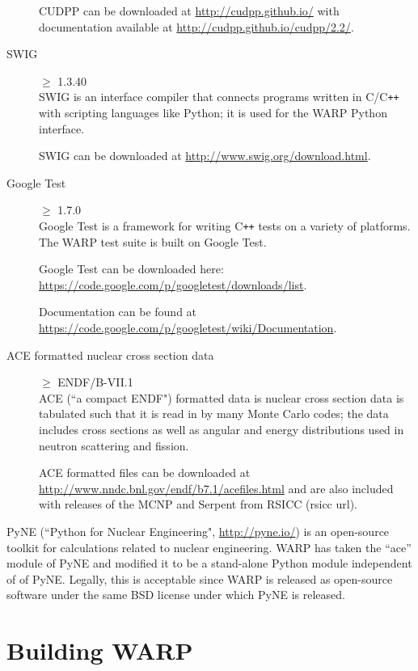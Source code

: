 \documentclass[twoside,a4paper]{refart}
\begin{document}
\begin{description}
CUDPP can be downloaded at \url{http://cudpp.github.io/} with documentation available at 
\url{http://cudpp.github.io/cudpp/2.2/}.

\item[SWIG]$\ge$ 1.3.40 \\
SWIG is an interface compiler that connects programs written in C/C\texttt{++} with scripting languages
like Python; it is used for the WARP Python interface.

SWIG can be downloaded at \url{http://www.swig.org/download.html}.

\item[Google Test]$\ge$ 1.7.0 \\
Google Test is a framework for writing C\texttt{++} tests on a variety of platforms. The WARP test suite
is built on Google Test.

Google Test can be downloaded here: \url{https://code.google.com/p/googletest/downloads/list}.

Documentation can be found at \url{https://code.google.com/p/googletest/wiki/Documentation}.

\item[ACE formatted nuclear cross section data]
$\ge$ ENDF/B-VII.1 \\
ACE (``a compact ENDF") formatted data is nuclear cross section data is tabulated such that it is read in 
by many Monte Carlo codes; the data includes cross sections as well as angular and energy distributions 
used in neutron scattering and fission.

ACE formatted files can be downloaded at \url{http://www.nndc.bnl.gov/endf/b7.1/acefiles.html} and are 
also included with releases of the MCNP and Serpent from RSICC (rsicc url).

\end{description}

PyNE (``Python for Nuclear Engineering", \url{http://pyne.io/}) is an open-source toolkit for calculations related to nuclear
engineering.  WARP has taken the ``ace'' module of PyNE and modified it to be a stand-alone Python module independent of of PyNE.  Legally, this is acceptable since WARP is released as open-source software under the same BSD license under which PyNE is released.

\section{Building WARP}
\end{document}
